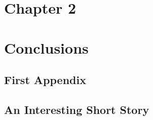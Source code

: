 \documentclass[pdftex,spanish]{pucthesis}	%
\begin{document}
\chapter[CHAPTER 2]{Chapter 2} \label{ch2}


\chapter[CONCLUSIONS]{Conclusions}



\cleardoublepage
{} \label{references}

\renewcommand{\bibname}{REFERENCES}



\appendix %

\newpage
\section[First Appendix]{First Appendix}


\newpage
\section[An Interesting Short Story]{An Interesting Short Story}

\end{document}
